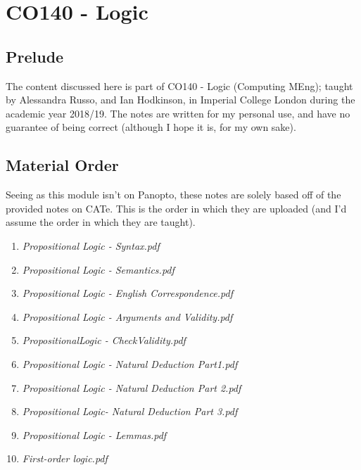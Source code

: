 \documentclass[a4paper, 12pt]{article}
\begin{document}
    \section*{CO140 - Logic}
        \subsection*{Prelude}
            The content discussed here is part of CO140 - Logic (Computing MEng); taught by Alessandra Russo, and Ian Hodkinson, in Imperial College London during the academic year 2018/19. The notes are written for my personal use, and have no guarantee of being correct (although I hope it is, for my own sake).
        \subsection*{Material Order}
            Seeing as this module isn't on Panopto, these notes are solely based off of the provided notes on CATe. This is the order in which they are uploaded (and I'd assume the order in which they are taught).
            \begin{enumerate}[1.]
                \itemsep0em
                \item \textit{Propositional Logic - Syntax.pdf}
                \item \textit{Propositional Logic - Semantics.pdf}
                \item \textit{Propositional Logic - English Correspondence.pdf}
                \item \textit{Propositional Logic - Arguments and Validity.pdf}
                \item \textit{PropositionalLogic - CheckValidity.pdf}
                \item \textit{Propositional Logic - Natural Deduction Part1.pdf}
                \item \textit{Propositional Logic - Natural Deduction Part 2.pdf}
                \item \textit{Propositional Logic- Natural Deduction Part 3.pdf}
                \item \textit{Propositional Logic - Lemmas.pdf}
                \item \textit{First-order logic.pdf}
            \end{enumerate}
\end{document}
